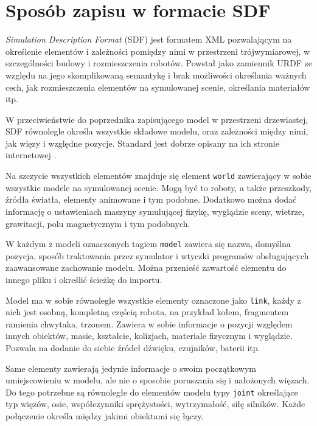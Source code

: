 \section{Sposób zapisu w formacie SDF}
	\emph{Simulation Description Format} (SDF) jest formatem XML pozwalającym na określenie elementów i zależności pomiędzy nimi w przestrzeni trójwymiarowej, w szczególności budowy i rozmieszczenia robotów.
	Powstał jako zamiennik URDF ze względu na jego skomplikowaną semantykę i brak możliwości określania ważnych cech, jak rozmieszczenia elementów na symulowanej scenie, określania materiałów itp.

	W przeciwieństwie do poprzednika zapisującego model w przestrzeni drzewiastej, SDF równolegle określa wszystkie składowe modelu, oraz zależności między nimi, jak więzy i względne pozycje.
	Standard jest dobrze opisany na ich stronie internetowej \cite{sdf_website}.

	Na szczycie wszystkich elementów znajduje się element \texttt{world} zawierający w sobie wszystkie modele na symulowanej scenie.
	Mogą być to roboty, a także przeszkody, źródła światła, elementy animowane i tym podobne.
	Dodatkowo można dodać informację o ustawieniach maszyny symulującej fizykę, wyglądzie sceny, wietrze, grawitacji, polu magnetycznym i tym podobnych.

	W każdym z modeli oznaczonych tagiem \texttt{model} zawiera się nazwa, domyślna pozycja, sposób traktowania przez symulator i wtyczki programów obsługujących zaawansowane zachowanie modelu.
	Można przenieść zawartość elementu do innego pliku i określić ścieżkę do importu.

	Model ma w sobie równolegle wszystkie elementy oznaczone jako \texttt{link}, każdy z nich jest osobną, kompletną częścią robota, na przykład kołem, fragmentem ramienia chwytaka, trzonem.
	Zawiera w sobie informacje o pozycji względem innych obiektów, masie, kształcie, kolizjach, materiale fizycznym i wyglądzie.
	Pozwala na dodanie do siebie źródeł dźwięku, czujników, baterii itp.

	Same elementy zawierają jedynie informacje o swoim początkowym umiejscowieniu w modelu, ale nie o sposobie poruszania się i nałożonych więzach.
	Do tego potrzebne są równoległe do elementów modelu typy \texttt{joint} określające typ więzów, osie, współczynniki sprężystości, wytrzymałość, siłę silników.
	Każde połączenie określa między jakimi obiektami się łączy.


